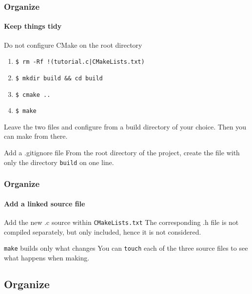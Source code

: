 \begin{frame}
\frametitle{Organize}
\framesubtitle{Keep things tidy}

\begin{block}{Do not configure CMake on the root directory}
\begin{enumerate}
\item \texttt{\$ rm -Rf !(tutorial.c|CMakeLists.txt)}
\item \texttt{\$ mkdir build \&\& cd build}
\item \texttt{\$ cmake ..}
\item \texttt{\$ make}
\end{enumerate}
Leave the two files and configure from a build directory of your choice. Then you can make from there.
\end{block}
\pause
\begin{block}{Add a .gitignore file}
From the root directory of the project, create the file with only the directory \texttt{build} on one line.
\end{block}

\end{frame}

\begin{frame}
\frametitle{Organize}
\framesubtitle{Add a linked source file}

\begin{block}{Add the new .c source within \texttt{CMakeLists.txt}}
The corresponding .h file is not compiled separately, but only included, hence it is not considered.
\end{block}
\begin{block}{\texttt{make} builds only what changes}
You can \texttt{touch} each of the three source files to see what happens when making.
\end{block}

\end{frame}

\subsection{Organize}

